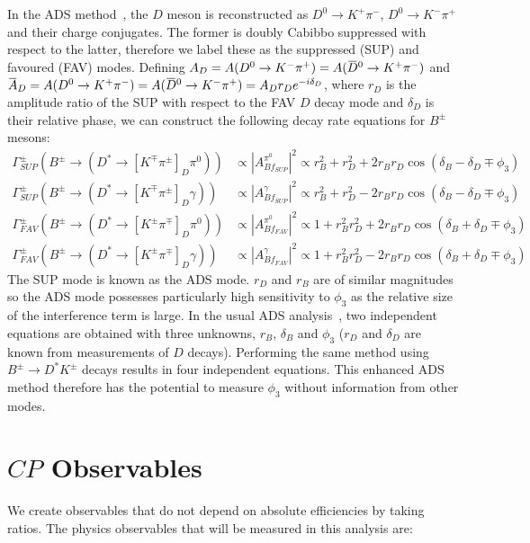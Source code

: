 \documentclass[oneside,12pt]{article}
\newcommand{\overbar}[1]{\mkern 1.5mu\overline{\mkern-1.5mu#1\mkern-1.5mu}\mkern
1.5mu}
\begin{document}
In the ADS method~\cite{ADSRef}, the $D$ meson is reconstructed as
$D^{0}\rightarrow K^{+}\pi^{-}$, $D^{0}\rightarrow K^{-}\pi^{+}$ and their
charge conjugates. The former is doubly Cabibbo suppressed with respect to the
latter, therefore we label these as the suppressed (SUP) and favoured (FAV)
modes. Defining $A_{D}=A(D^{0}\rightarrow
K^{-}\pi^{+})=A(\overbar{D}^{0}\rightarrow K^{+}\pi^{-})$ and $\overbar{A}_{D}=
A(D^{0}\rightarrow K^{+}\pi^{-})=A(\overbar{D}^{0}\rightarrow
K^{-}\pi^{+})=A_{D}r_{D}e^{-i\delta_{D}}$, where $r_{D}$ is the amplitude ratio
of the SUP with respect to the FAV $D$ decay mode and $\delta_{D}$ is their
relative phase, we can construct the following decay rate equations for
$B^{\pm}$ mesons:
  \begin{align*}
		\Gamma_{SUP}^{\pm}(B^{\pm}\rightarrow (D^{*}\rightarrow
[K^{\mp}\pi^{\pm}]_D\pi^{0})) &\propto |A^{\pi^0}_{Bf_{SUP}}|^2 \propto r_{B}^{2}
+ r_{D}^{2} + 2r_{B}r_{D}\cos(\delta_{B} - \delta_{D} \mp \phi_{3}) \\
		\Gamma_{SUP}^{\pm}(B^{\pm}\rightarrow (D^{*}\rightarrow
[K^{\mp}\pi^{\pm}]_D\gamma)) &\propto |A^{\gamma}_{Bf_{SUP}}|^2 \propto r_{B}^{2}
+ r_{D}^{2} - 2r_{B}r_{D}\cos(\delta_{B} - \delta_{D} \mp \phi_{3}) \\
		\Gamma_{FAV}^{\pm}(B^{\pm}\rightarrow (D^{*}\rightarrow
[K^{\pm}\pi^{\mp}]_D\pi^{0})) &\propto |A^{\pi^0}_{Bf_{FAV}}|^2 \propto 1 +
r_{B}^{2}r_{D}^{2} + 2r_{B}r_{D}\cos(\delta_{B} + \delta_{D} \mp \phi_{3}) \\
		\Gamma_{FAV}^{\pm}(B^{\pm}\rightarrow (D^{*}\rightarrow
[K^{\pm}\pi^{\mp}]_D\gamma)) &\propto |A^{\gamma}_{Bf_{FAV}}|^2 \propto 1 +
r_{B}^{2}r_{D}^{2} - 2r_{B}r_{D}\cos(\delta_{B} + \delta_{D} \mp \phi_{3})
  \end{align*}
\noindent The SUP mode is known as the ADS mode. $r_{D}$ and $r_{B}$ are of
similar magnitudes so the ADS mode possesses particularly high sensitivity to
$\phi_3$ as the relative size of the interference term is large. In the usual
ADS analysis~\cite{ADSRef}, two independent equations are obtained with three
unknowns, $r_B$, $\delta_B$ and $\phi_3$ ($r_{D}$ and $\delta_D$ are known from
measurements of $D$ decays). Performing the same method using
$B^{\pm}\rightarrow D^{*}K^{\pm}$ decays results in four independent equations. This
enhanced ADS method therefore has the potential to measure $\phi_3$ without
information from other modes.

\vspace{-3mm}
\section{\normalsize $CP$ Observables} \label{sec:observables}
We create observables that do not depend on absolute efficiencies by taking
ratios. The physics observables that will be measured in this analysis are:
\end{document}
